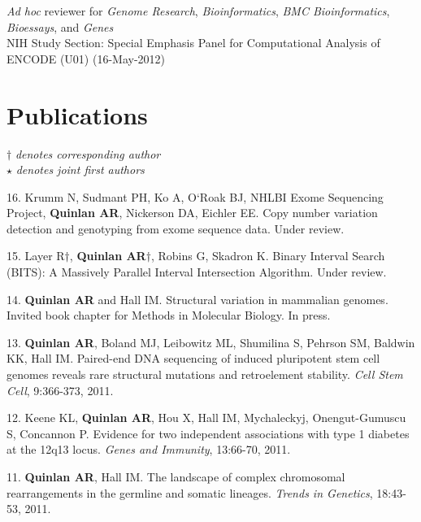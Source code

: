 \documentclass[margin,line]{cv}
\begin{document}
\begin{resume}
    \textit{Ad hoc} reviewer for \textit{Genome Research}, \textit{Bioinformatics}, \textit{BMC Bioinformatics}, 
    \textit{Bioessays}, and \textit{Genes}\\

	NIH Study Section: Special Emphasis Panel for Computational Analysis of ENCODE (U01) (16-May-2012)\\
    
    \section{\mysidestyle Publications}
    $\dagger$\textit{ denotes corresponding author}\\
    $\star$\textit{ denotes joint first authors}

    \begin{list}{*}{}
    \item[16.] Krumm N, Sudmant PH, Ko A, O`Roak BJ, NHLBI Exome Sequencing Project, 
    \textbf{Quinlan AR}, Nickerson DA, Eichler EE. 
    Copy number variation detection and genotyping from exome sequence data. Under review.
    
    \item[15.] Layer R$\dagger$, \textbf{Quinlan AR}$\dagger$, Robins G, Skadron K. 
    Binary Interval Search (BITS): A Massively Parallel Interval Intersection Algorithm. 
    Under review.
    
    \item[14.] \textbf{Quinlan AR} and Hall IM. 
    Structural variation in mammalian genomes. Invited book chapter for Methods in Molecular Biology.
    In press.
   
    \item[13.] \textbf{Quinlan AR}, Boland MJ, Leibowitz ML, Shumilina S, Pehrson SM, Baldwin KK, Hall IM. 
    Paired-end DNA sequencing of induced pluripotent stem cell genomes reveals rare structural mutations and retroelement stability. 
    \textit{Cell Stem Cell}, 9:366-373, 2011.
    
    \item[12.] Keene KL, \textbf{Quinlan AR}, Hou X, Hall IM, Mychaleckyj, Onengut-Gumuscu S, Concannon P.
    Evidence for two independent associations with type 1 diabetes at the 12q13 locus. 
    \textit{Genes and Immunity}, 13:66-70, 2011.
    
    \item[11.] \textbf{Quinlan AR}, Hall IM. 
    The landscape of complex chromosomal rearrangements in the germline and somatic lineages. 
    \textit{Trends in Genetics}, 18:43-53, 2011.
    

\end{list}
\end{resume}
\end{document}
